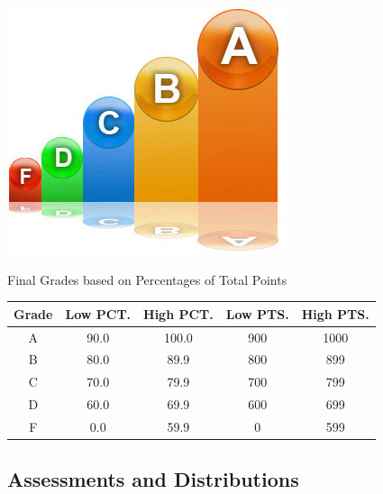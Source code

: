 \documentclass{tufte-handout}
\begin{document}
\begin{marginfigure}%
  \includegraphics[width=\linewidth]{../assets/lettergrades.jpg}
  \caption{Final Grades based on Percentages of Total Points}
  \label{fig:marginfig}
\end{marginfigure}

\begin{fullwidth}

\begin{center}
  \begin{tabular}{  c | c  c | c  c }
    \hline
    \rowcolor{Grey}
    Grade & Low PCT. & High PCT. & Low PTS. & High PTS.\\ \hline \hline
    \rowcolor{BurntOrange}
    A & 90.0 & 100.0 & 900 & 1000 \\ \hline
    \rowcolor{Yellow}
    B & 80.0 & 89.9 & 800 & 899 \\ \hline
    \rowcolor{SkyBlue}
    C & 70.0 & 79.9 & 700 & 799 \\ \hline
    \rowcolor{LimeGreen}
    D & 60.0 & 69.9 & 600 & 699\\ \hline
    \rowcolor{Red}
    F & 0.0  & 59.9 & 0 & 599\\     
    \hline
  \end{tabular}
\end{center}
\end{fullwidth}

\subsection{Assessments and Distributions}
\end{document}
